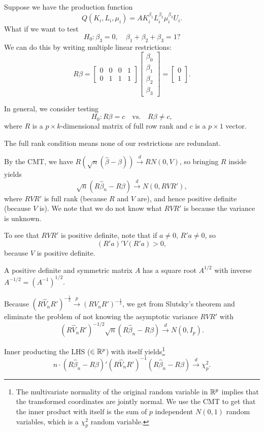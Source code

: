 \begin{proposition}
	Suppose we have the production function \[
		Q(K_i, L_i, \mu_i) = A K_i^{\beta_1} L_i^{\beta_2} \mu_i^{\beta_3} U_{i}
	.\] What if we want to test \[
		H_0: \beta_3 = 0, \quad \beta_1 + \beta_2 +\beta_3 = 1
	?\] 
	We can do this by writing multiple linear restrictions: \[
		R \beta =
		\begin{bmatrix}
			0 & 0 & 0 & 1 \\
			0 & 1 & 1 & 1
		\end{bmatrix} \begin{bmatrix}
		\beta_0 \\
		\beta_1 \\ \beta_2 \\ \beta_3
		\end{bmatrix} = \begin{bmatrix}
		0 \\
		1
		\end{bmatrix} 
	.\] 

	In general, we consider testing \[
		H_0: R\beta = c \quad \text{vs.} \quad R\beta \ne c
	,\] where $R$ is a $p \times k$-dimensional matrix of full row rank and $c$ is a $p \times 1$ vector.
	
	The full rank condition means none of our restrictions are redundant.
	
	By the CMT, we have $R \left( \sqrt{n} \left( \hat{\beta}- \beta \right) \right) \xrightarrow{d} R N(0,V)$, so bringing $R$ inside yields \[
		\sqrt{n}(R\hat{\beta}_n - R\beta) \xrightarrow{d} N(0, RVR')
	,\] where $RVR'$ is full rank (because $R$ and $V$ are), and hence positive definite (because $V$ is). We note that we do not know what $RVR'$ is because the variance is unknown.
	
	To see that $RVR'$ is positive definite, note that if $a \ne 0$, $R' a \ne 0$, so \[
		(R' a)' V(R' a) > 0
	,\] because $V$ is positive definite.
	
	A positive definite and symmetric matrix $A$ has a square root $A^{1/2}$ with inverse $A^{-1/2} = (A^{-1})^{1/2}$.
	
		Because $\left( R \hat{V}_n R' \right)^{-\frac{1}{2}} \xrightarrow{p} \left( R V_n R' \right)^{-\frac{1}{2}}$, we get from Slutsky's theorem and eliminate the problem of not knowing the asymptotic variance $RVR'$ with \[
			(R\hat{V}_n R')^{-1/2} \sqrt{n}(R\hat{\beta}_n - R\beta) \xrightarrow{d} N(0, I_p)
		.\] 
	
		 Inner producting the LHS ($\in \mathbb{R}^p$) with itself yields\footnote{The multivariate normality of the original random variable in $\mathbb{R}^p$ implies that the transformed coordinates are jointly normal. We use the CMT to get that the inner product with itself is the sum of $p$ independent $N(0,1)$ random variables, which is a $\chi^2_p$ random variable.} \[
		n \cdot (R\hat{\beta}_n - R\beta)' (R\hat{V}_n R')^{-1} (R\hat{\beta}_n - R\beta) \xrightarrow{d} \chi^2_p
	.\] 
	

\end{proposition}

